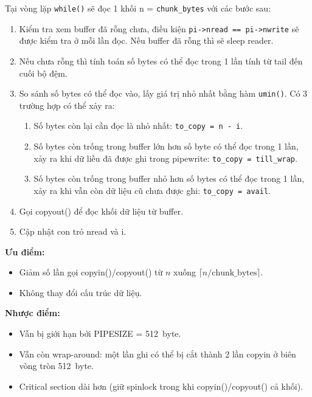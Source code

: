 \documentclass[12pt,a4paper]{article}
\newcommand{\code}[1]{\texttt{#1}}
\newcommand{\tightlist}{\setlength{\itemsep}{2pt}\setlength{\parskip}{0pt}}
\begin{document}
Tại vòng lặp \code{while()} sẽ đọc 1 khối n = \code{chunk\_bytes} với các bước sau:
\begin{enumerate}
    \item Kiểm tra xem buffer đã rỗng chưa, điều kiện \code{pi->nread == pi->nwrite} sẽ được kiểm tra ở mỗi lần đọc. Nếu buffer đã rỗng thì sẽ sleep reader.
    \item Nếu chưa rỗng thì tính toán số bytes có thể đọc trong 1 lần tính từ tail đến cuối bộ đệm.
    \item So sánh số bytes có thể đọc vào, lấy giá trị nhỏ nhất bằng hàm \code{umin()}. Có 3 trường hợp có thể xảy ra:
    \begin{enumerate}
        \item Số bytes còn lại cần đọc là nhỏ nhất: \code{to\_copy = n - i}.
        \item Số bytes còn trống trong buffer lớn hơn số byte có thể đọc trong 1 lần,  xảy ra khi dữ liều đã được ghi trong pipewrite: \code{to\_copy = till\_wrap}.
        \item Số bytes còn trống trong buffer nhỏ hơn số bytes có thể đọc trong 1 lần, xảy ra khi vẫn còn dữ liệu cũ chưa được ghi: \code{to\_copy = avail}.
    \end{enumerate}
    \item Gọi copyout() để đọc khối dữ liệu từ buffer.
    \item Cập nhật con trỏ nread và i.
\end{enumerate}
\textbf{Ưu điểm:}
\begin{itemize}\tightlist
    \item Giảm số lần gọi copyin()/copyout() từ $n$ xuống $\lceil n/\text{chunk\_bytes} \rceil$.
    \item Không thay đổi cấu trúc dữ liệụ.
\end{itemize}

\textbf{Nhược điểm:}
\begin{itemize}\tightlist
    \item Vẫn bị giới hạn bởi PIPESIZE = 512~byte.
    \item Vẫn còn wrap-around: một lần ghi có thể bị cắt thành 2 lần copyin ở biên
    vòng tròn 512~byte.
    \item Critical section dài hơn (giữ spinlock trong khi copyin()/copyout() cả khối).
\end{itemize}
\end{document}
